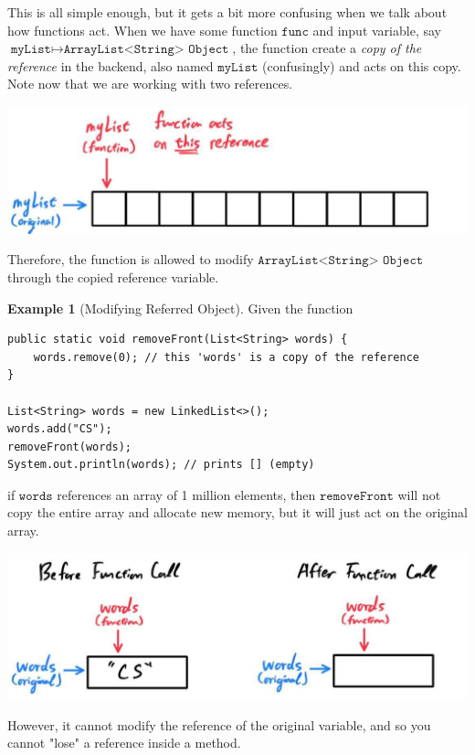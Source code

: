 \documentclass{article}
\theoremstyle{definition}
\newtheorem{example}{Example}[section]
\theoremstyle{remark}
\theoremstyle{definition}
\begin{document}
This is all simple enough, but it gets a bit more confusing when we talk about how functions act. When we have some function $\texttt{func}$ and input variable, say $\texttt{myList} \mapsto \texttt{ArrayList<String> Object}$, the function create a \textit{copy of the reference} in the backend, also named $\texttt{myList}$ (confusingly) and acts on this copy. Note now that we are working with two references. 
\begin{center}
    \includegraphics[scale=0.3]{img/functions_on_references.jpg}
\end{center}
Therefore, the function is allowed to modify $\texttt{ArrayList<String> Object}$ through the copied reference variable. 

\begin{example}[Modifying Referred Object]
Given the function 
\begin{verbatim}
public static void removeFront(List<String> words) {
    words.remove(0); // this 'words' is a copy of the reference 
}

List<String> words = new LinkedList<>(); 
words.add("CS"); 
removeFront(words); 
System.out.println(words); // prints [] (empty)
\end{verbatim}
if $\texttt{words}$ references an array of 1 million elements, then $\texttt{removeFront}$ will not copy the entire array and allocate new memory, but it will just act on the original array. 
\begin{center}
    \includegraphics[scale=0.3]{img/func_ref_example1.jpg}
\end{center}
\end{example}

However, it cannot modify the reference of the original variable, and so you cannot "lose" a reference inside a method.  
\end{document}
